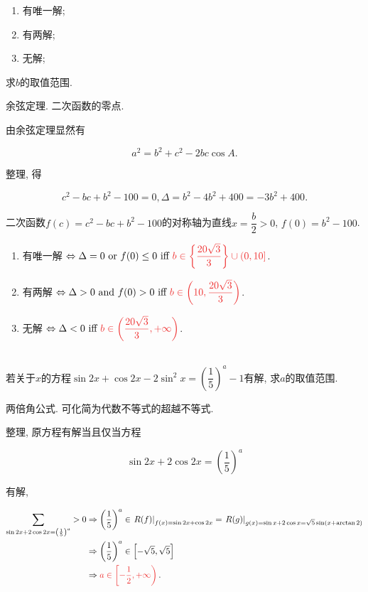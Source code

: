 \documentclass[8pt]{article}
\begin{document}
			\begin{enumerate}[label=(\arabic*)]
				\item 有唯一解;
				\item 有两解;
				\item 无解;
			\end{enumerate}

			求$b$的取值范围.

		余弦定理. 二次函数的零点.

			由余弦定理显然有

			$$a^2=b^2+c^2-2bc\cos A.$$

			整理, 得

			$$c^2-bc+b^2-100=0, \Delta = b^2 - 4b^2 + 400 = -3b^2 + 400.$$

			二次函数$f(c) = c^2-bc+b^2-100$的对称轴为直线$x=\dfrac{b}{2} > 0$, $f(0) = b^2-100$.

			\begin{enumerate}[label=(\arabic*)]
				\item 有唯一解 $\Leftrightarrow \Delta = 0 \lgor f(0) \leq 0 \Iff \ansmath{b\in \left\{\dfrac{20\sqrt{3}}{3}\right\} \cup (0, 10]}$.
				\item 有两解 $\Leftrightarrow \Delta > 0 \lgand f(0) > 0 \Iff \ansmath{b \in \left(10, \dfrac{20\sqrt{3}}{3}\right)}$.
				\item 无解 $\Leftrightarrow \Delta < 0 \Iff \ansmath{b\in \left(\dfrac{20\sqrt{3}}{3}, +\infty\right)}$.
			\end{enumerate}
		~\\

		若关于$x$的方程$\sin 2x+\cos 2x-2\sin^2 x=\left(\dfrac{1}{5}\right)^a - 1$有解, 求$a$的取值范围.

		两倍角公式. 可化简为代数不等式的超越不等式.

			整理, 原方程有解当且仅当方程

			$$\sin 2x+2\cos 2x=\left(\frac{1}{5}\right)^a$$

			有解,

			\begin{align*}
				\sum_{\sin 2x+2\cos 2x=\left(\frac{1}{5}\right)^a} > 0 &\Rightarrow \left(\frac{1}{5}\right)^a \in \at{R(f)}{f(x)=\sin 2x+\cos 2x} = \at{R(g)}{g(x)=\sin x + 2\cos x = \sqrt{5} \sin(x + \arctan 2)}\\
				&\Rightarrow \left(\frac{1}{5}\right)^a \in \left[-\sqrt{5}, \sqrt{5}\right]\\
				&\Rightarrow \ansmath{a \in \left[-\frac{1}{2}, +\infty \right)}.
			\end{align*}
		~\\
\end{document}
